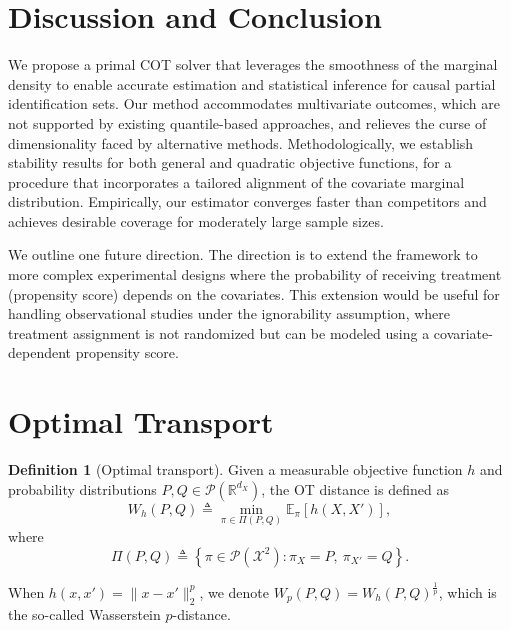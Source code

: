 \documentclass{article}
\theoremstyle{plain}
\theoremstyle{definition}
\newtheorem{definition}{Definition}[section]
\def\EE{\mathbb{E}}
\def\PP{P}
\def\QQ{Q}
\def\RR{\mathbb{R}}
\def\calP{\mathcal{P}}
\def\calX{\mathcal{X}}
\newcommand{\Let}{\triangleq}
\theoremstyle{plain}
\def\EE{\mathbb{E}}
\def\RR{\mathbb{R}}
\def\calP{\mathcal{P}}
\def\calX{\mathcal{X}}
\renewcommand{\Let}{\triangleq}
\begin{document}


\section{Discussion and Conclusion}\label{sec:discussion}

We propose a primal COT solver that leverages the smoothness of the marginal density to enable accurate estimation and statistical inference for causal partial identification sets. Our method accommodates multivariate outcomes, which are not supported by existing quantile-based approaches, and relieves the curse of dimensionality faced by alternative methods.
Methodologically, we establish stability results for both general and quadratic objective functions, for a procedure that incorporates a tailored alignment of the covariate marginal distribution. Empirically, our estimator converges faster than competitors and achieves desirable coverage for moderately large sample sizes.


We outline one future direction.
The direction is to extend the framework to more complex experimental designs where the probability of receiving treatment (propensity score) depends on the covariates. This extension would be useful for handling observational studies under the ignorability assumption, where treatment assignment is not randomized but can be modeled using a covariate-dependent propensity score.



\printbibliography

\appendix

\section{Optimal Transport}\label{appe:sec:OT}
\begin{definition}[Optimal transport]
    Given a measurable objective function $h$ and probability distributions $\PP, \QQ \in \calP(\RR^{d_X})$, the OT distance is defined as 
    \[
    W_h(\PP, \QQ) \Let \min_{\pi \in \Pi(\PP, \QQ)} \EE_{\pi}[h(X, X')],
    \]
    where 
    \begin{equation}
    \Pi(\PP, \QQ) \Let \left\{\pi \in \calP(\calX^2): \pi_{X} = \PP,~\pi_{X'} = \QQ \right\}.
    \end{equation}
    
    When $h(x,x') = \|x - x'\|_2^p$, we denote $W_p(\PP, \QQ) = W_h(\PP, \QQ)^{\frac{1}{p}}$, which is the so-called Wasserstein $p$-distance.
\end{definition}
\end{document}
